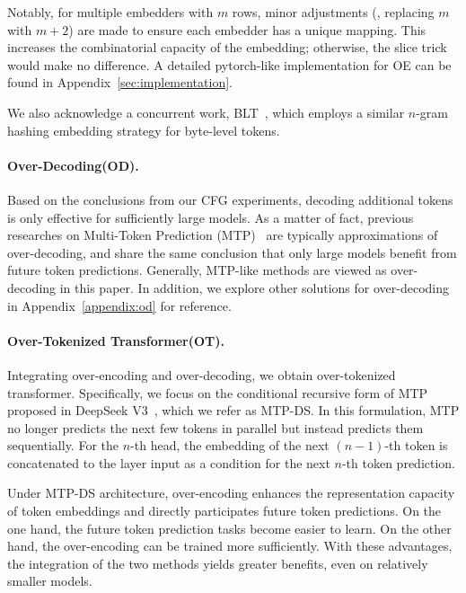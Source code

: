 Notably, for multiple embedders with $m$ rows, minor adjustments (\eg, replacing $m$ with $m+2$) are made to ensure each embedder has a unique mapping. This increases the combinatorial capacity of the embedding; otherwise, the slice trick would make no difference.
A detailed pytorch-like implementation for OE can be found in Appendix~\ref{sec:implementation}.

We also acknowledge a concurrent work, BLT~\cite{pagnoni2024bytelatenttransformerpatches}, which employs a similar $n$-gram hashing embedding strategy for byte-level tokens.

\paragraph{Over-Decoding(OD).} Based on the conclusions from our CFG experiments, decoding additional tokens is only effective for sufficiently large models. As a matter of fact, previous researches on Multi-Token Prediction (MTP)~\cite{gloeckle2024better} are typically approximations of over-decoding, and share the same conclusion that only large models benefit from future token predictions. Generally, MTP-like methods are viewed as over-decoding in this paper. In addition, we explore other solutions for over-decoding in Appendix~\ref{appendix:od} for reference.

\paragraph{Over-Tokenized Transformer(OT).} Integrating over-encoding and over-decoding, we obtain over-tokenized transformer. Specifically, we focus on the conditional recursive form of MTP proposed in DeepSeek V3~\cite{deepseekai2024deepseekv3technicalreport}, which we refer as MTP-DS. In this formulation, MTP no longer predicts the next few tokens in parallel but instead predicts them sequentially. For the $n$-th head, the embedding of the next $(n-1)$-th token is concatenated to the layer input as a condition for the next $n$-th token prediction. 

Under MTP-DS architecture, over-encoding enhances the representation capacity of token embeddings and directly participates future token predictions. On the one hand, the future token prediction tasks become easier to learn. On the other hand, the over-encoding can be trained more sufficiently. With these advantages, the integration of the two methods yields greater benefits, even on relatively smaller models.


